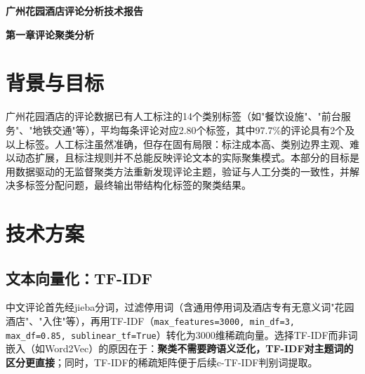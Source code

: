 \documentclass[11pt, a4paper]{article}
\begin{document}
\begin{center}
  {\LARGE\bfseries\heiti 广州花园酒店评论分析技术报告}\\[0.5em]
  {\normalsize }
\end{center}
\vspace{0.8em}

\begin{center}
  {\Large\bfseries\heiti 第一章\quad 评论聚类分析}\\[0.3em]
  {\small}
\end{center}
\vspace{0.5em}

\section{背景与目标}

广州花园酒店的评论数据已有人工标注的14个类别标签（如"餐饮设施"、"前台服务"、"地铁交通"等），平均每条评论对应2.80个标签，其中97.7\%的评论具有2个及以上标签。人工标注虽然准确，但存在固有局限：标注成本高、类别边界主观、难以动态扩展，且标注规则并不总能反映评论文本的实际聚集模式。本部分的目标是用数据驱动的无监督聚类方法重新发现评论主题，验证与人工分类的一致性，并解决多标签分配问题，最终输出带结构化标签的聚类结果。

\section{技术方案}

\subsection{文本向量化：TF-IDF}

中文评论首先经jieba分词，过滤停用词（含通用停用词及酒店专有无意义词"花园酒店"、"入住"等），再用TF-IDF（\texttt{max\_features=3000, min\_df=3, max\_df=0.85, sublinear\_tf=True}）转化为3000维稀疏向量。选择TF-IDF而非词嵌入（如Word2Vec）的原因在于：\textbf{聚类不需要跨语义泛化，TF-IDF对主题词的区分更直接}；同时，TF-IDF的稀疏矩阵便于后续c-TF-IDF判别词提取。
\end{document}
